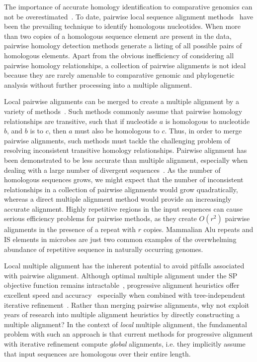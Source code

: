 \documentclass{ws-procs9x6}
\begin{document}
The importance of accurate homology identification to comparative genomics can not be overestimated~\cite{Kumar07}. To date, pairwise local sequence alignment methods~\cite{ref-blastz, ref-ssearch,repseek} have been the prevailing technique to identify homologous nucleotides.  When more than two copies of a homologous sequence element are present in the data, pairwise homology detection methods generate a listing of all possible pairs of homologous elements.  Apart from the obvious inefficiency of considering all pairwise homology relationships, a collection of pairwise alignments is not ideal because they are rarely amenable to comparative genomic and phylogenetic analysis without further processing into a multiple alignment.

Local pairwise alignments can be merged to create a multiple alignment by a variety of methods~\cite{ref-tba,ref-aba,ref-dialign,ref-related1}. Such methods commonly assume that pairwise homology relationships are transitive, such that if nucleotide $a$ is homologous to nucleotide $b$, and $b$ is to $c$, then $a$ must also be homologous to $c$.  Thus, in order to merge pairwise alignments, such methods must tackle the challenging problem of resolving inconsistent transitive homology relationships.  Pairwise alignment has been demonstrated to be less accurate than multiple alignment, especially when dealing with a large number of divergent sequences~\cite{ref-mlagan,ref-aubergene}.  As the number of homologous sequences grows, we might expect that the number of inconsistent relationships in a collection of pairwise alignments would grow quadratically, whereas a direct multiple alignment method would provide an increasingly accurate alignment.  Highly repetitive regions in the input sequences can cause serious efficiency problems for pairwise methods, as they create $O(r^{2})$ pairwise alignments in the presence of a repeat with $r$ copies.  Mammalian Alu repeats and IS elements in microbes are just two common examples of the overwhelming abundance of repetitive sequence in naturally occurring genomes.

Local multiple alignment has the inherent potential to avoid pitfalls associated with pairwise alignment. Although optimal multiple alignment under the SP objective function remains intractable~\cite{ref-wangjiang}, progressive alignment heuristics offer excellent speed and accuracy~\cite{ref-clustalw, ref-tcoffee} especially when combined with tree-independent iterative refinement~\cite{ref-muscle}. Rather than merging pairwise alignments, why not exploit years of research into multiple alignment heuristics by directly constructing a multiple alignment?   In the context of \textit{local} multiple alignment, the fundamental problem with such an approach is that current methods for progressive alignment with iterative refinement compute \textit{global} alignments, i.e. they implicitly assume that input sequences are homologous over their entire length.
\end{document}
